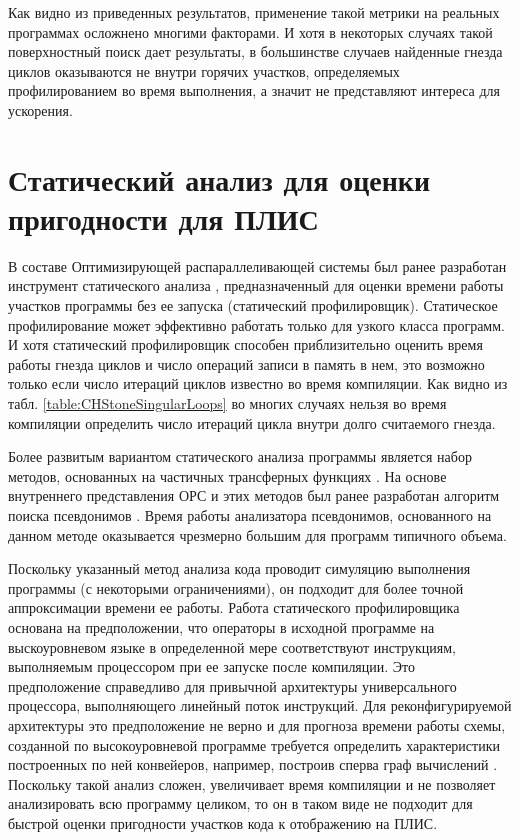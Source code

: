 \documentclass[utf8]{psta}%
\begin{document}
Как видно из приведенных результатов, применение такой метрики на реальных программах осложнено многими факторами. И хотя в некоторых случаях такой поверхностный поиск дает результаты, в большинстве случаев найденные гнезда циклов оказываются не внутри горячих участков, определяемых профилированием во время выполнения, а значит не представляют интереса для ускорения.

\section{Статический анализ для оценки пригодности для ПЛИС}

В составе Оптимизирующей распараллеливающей системы \cite{OPS2018} был ранее разработан инструмент статического анализа \cite{2010}, предназначенный для оценки времени работы участков программы без ее запуска (статический профилировщик). Статическое профилирование может эффективно работать только для узкого класса программ. И хотя статический профилировщик способен приблизительно оценить время работы гнезда циклов и число операций записи в память в нем, это возможно только если число итераций циклов известно во время компиляции. Как видно из табл. \ref{table:CHStoneSingularLoops} во многих случаях нельзя во время компиляции определить число итераций цикла внутри долго считаемого гнезда.

Более развитым вариантом статического анализа программы является набор методов, основанных на частичных трансферных функциях \cite{PartialTransferFunctions}. На основе внутреннего представления ОРС и этих методов был ранее разработан алгоритм поиска псевдонимов \cite{Poluyan2010}. Время работы анализатора псевдонимов, основанного на данном методе оказывается чрезмерно большим для программ типичного объема. 

Поскольку указанный метод анализа кода проводит симуляцию выполнения программы (с некоторыми ограничениями), он подходит для более точной аппроксимации времени ее работы. Работа статического профилировщика основана на предположении, что операторы в исходной программе на выскоуровневом языке в определенной мере соответствуют инструкциям, выполняемым процессором при ее запуске после компиляции. Это предположение справедливо для привычной архитектуры универсального процессора, выполняющего линейный поток инструкций. Для реконфигурируемой архитектуры это предположение не верно и для прогноза времени работы схемы, созданной по высокоуровневой программе требуется определить характеристики построенных по ней конвейеров, например, построив сперва граф вычислений \cite{Steinberg2016}. Поскольку такой анализ сложен, увеличивает время компиляции и не позволяет анализировать всю программу целиком, то он в таком виде не подходит для быстрой оценки пригодности участков кода к отображению на ПЛИС.
\end{document}
